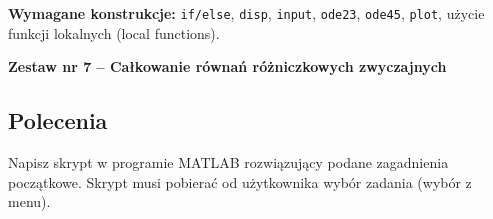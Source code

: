 \documentclass[a4paper,11pt]{article}
\begin{document}
\vspace{0.3cm}
\begin{ramka}
\textbf{Wymagane konstrukcje:}
\texttt{if/else}, \texttt{disp}, \texttt{input}, \texttt{ode23}, \texttt{ode45}, \texttt{plot}, użycie funkcji lokalnych (local functions).
\end{ramka}

\clearpage
\begin{center}
  {\large\bfseries Zestaw nr 7 \quad -- \quad Całkowanie równań różniczkowych zwyczajnych}
\end{center}
\hrulefill
\vspace{0.4cm}

\subsection*{Polecenia}

Napisz skrypt w programie MATLAB rozwiązujący podane zagadnienia początkowe. Skrypt musi pobierać od użytkownika wybór zadania (wybór z menu).
\end{document}
